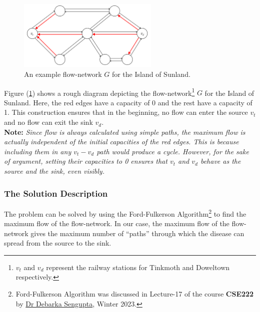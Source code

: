 \documentclass[12pt]{report}
\begin{document}
    \hfill
    \begin{figure}[htp]
        \begin{center}
            \includegraphics[width=0.6\textwidth]{network.png}
        \end{center}
        \caption{An example flow-network $G$ for the Island of Sunland.}
        \label{fig:network}
    \end{figure}
    \linebreak
    Figure (\ref{fig:network}) shows a rough diagram depicting the flow-network\footnote{
        $v_{t}$ and $v_{d}$ represent the railway stations for Tinkmoth and Doweltown respectively.
    } $G$ for the Island of Sunland.
    Here, the red edges have a capacity of 0 and the rest have a capacity of 1.
    This construction ensures that in the beginning, no flow can enter the source $v_{t}$ and no flow can exit the sink $v_{d}$.
    \vspace*{10pt} \\
    \textbf{Note:} \textit{Since flow is always calculated using simple paths, the maximum flow is actually independent of the initial capacities of the red edges.
    This is because including them in any $v_{t}-v_{d}$ path would produce a cycle.
    However, for the sake of argument, setting their capacities to 0 ensures that $v_{t}$ and $v_{d}$ behave as the source and the sink, even visibly.}
    \vfill

    \subsubsection*{The Solution Description}
    The problem can be solved by using the Ford-Fulkerson Algorithm\footnote{
        Ford-Fulkerson Algorithm was discussed in Lecture-17 of the course \textbf{CSE222} by \href{mailto:debarka@iiitd.ac.in}{Dr Debarka Sengupta},
        Winter 2023.
    } to find the maximum flow of the flow-network.
    In our case, the maximum flow of the flow-network gives the maximum
    number of ``paths'' through which the disease can spread from the source to the sink.
\end{document}
